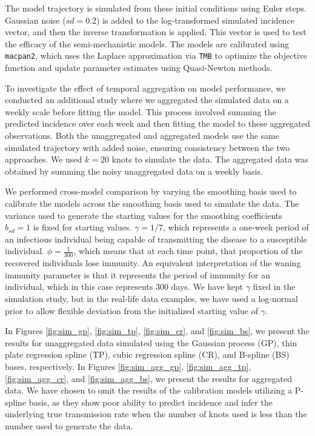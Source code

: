 \documentclass[
11pt, %
oneside, %
english, %
singlespacing, %
]{macthesis} %
\begin{document}
The model trajectory is simulated from these initial conditions using Euler steps. Gaussian noise (\(sd = 0.2\)) is added to the log-transformed simulated incidence vector, and then the inverse transformation is applied. This vector is used to test the efficacy of the semi-mechanistic models. The models are calibrated using \texttt{macpan2}, which uses the Laplace approximation via \texttt{TMB} to optimize the objective function and update parameter estimates using Quasi-Newton methods.

To investigate the effect of temporal aggregation on model performance, we conducted an additional study where we aggregated the simulated data on a weekly scale before fitting the model. This process involved summing the predicted incidence over each week and then fitting the model to these aggregated observations. Both the unaggregated and aggregated models use the same simulated trajectory with added noise, ensuring consistency between the two approaches. We used \(k=20\) knots to simulate the data. The aggregated data was obtained by summing the noisy unaggregated data on a weekly basis.

We performed cross-model comparison by varying the smoothing basis used to calibrate the models across the smoothing basis used to simulate the data. The variance used to generate the starting values for the smoothing coefficients \(b_{sd} = 1\) is fixed for starting values. \(\gamma = 1/7\), which represents a one-week period of an infectious individual being capable of transmitting the disease to a susceptible individual. \(\phi = \frac{1}{300}\), which means that at each time point, that proportion of the recovered individuals lose immunity. An equivalent interpretation of the waning immunity parameter is that it represents the period of immunity for an individual, which in this case represents 300 days. We have kept \(\gamma\) fixed in the simulation study, but in the real-life data examples, we have used a log-normal prior to allow flexible deviation from the initialized starting value of \(\gamma\).

In Figures \ref{fig:sim_gp}, \ref{fig:sim_tp}, \ref{fig:sim_cr}, and \ref{fig:sim_bs}, we present the results for unaggregated data simulated using the Gaussian process (GP), thin plate regression spline (TP), cubic regression spline (CR), and B-spline (BS) bases, respectively. In Figures \ref{fig:sim_agg_gp}, \ref{fig:sim_agg_tp}, \ref{fig:sim_agg_cr}, and \ref{fig:sim_agg_bs}, we present the results for aggregated data. We have chosen to omit the results of the calibration models utilizing a P-spline basis, as they show poor ability to predict incidence and infer the underlying true transmission rate when the number of knots used is less than the number used to generate the data.
\end{document}
